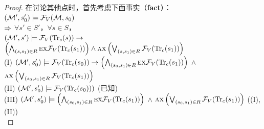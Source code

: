 \begin{proof}
	在讨论其他点时，首先考虑下面事实（\textbf{fact}）：\\
	$({\cal M}',s_0') \models {\cal F}_V({\cal M},s_0)$\\
	$\Rightarrow$ $\forall s'\in S'$，$\forall s\in S$，\\ $({\cal M}', s')\models {\cal F}_V(\textrm{Tr}_c(s)) \rightarrow$  $\left(\bigwedge_{(s,s_1)\in R} \textsc{e} \textsc{x} {\cal F}_V(\textrm{Tr}_c(s_1))\right)\wedge \textsc{a} \textsc{x} \left( \bigvee_{(s,s_1)\in R} {\cal F}_V(\textrm{Tr}_c(s_1))\right)$  \\
	(I) $({\cal M}', s_0') \models {\cal F}_V(\textrm{Tr}_c(s_0)) \rightarrow \left(\bigwedge_{(s_0, s_1) \in R} \textsc{e} \textsc{x} {\cal F}_V(\textrm{Tr}_c(s_1))\right)$ $\wedge$ $\textsc{a} \textsc{x} \left(\bigvee_{(s_0, s_1) \in R} {\cal F}_V(\textrm{Tr}_c(s_1)) \right)$     \\
	(II) $({\cal M}', s_0') \models {\cal F}_V(\textrm{Tr}_c(s_0)))$  \hfill  (已知)\\
	(III) $({\cal M}', s_0') \models \left(\bigwedge_{(s_0, s_1) \in R} \textsc{e} \textsc{x} {\cal F}_V(\textrm{Tr}_c(s_1))\right)$ $\wedge$ $\textsc{a} \textsc{x} \left(\bigvee_{(s_0, s_1) \in R} {\cal F}_V(\textrm{Tr}_c(s_1)) \right)$  \hfill  ((I),(II))\\
	

\end{proof}
